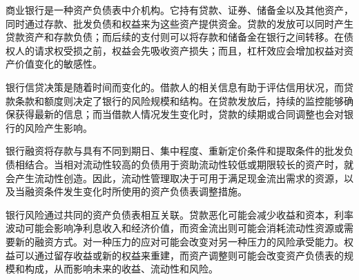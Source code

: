 

商业银行是一种资产负债表中介机构。它持有贷款、证券、储备金以及其他资产，同时通过存款、批发负债和权益来为这些资产提供资金。贷款的发放可以同时产生贷款资产和存款负债；而后续的支付则可以将存款和储备金在银行之间转移。在债权人的请求权受损之前，权益会先吸收资产损失；而且，杠杆效应会增加权益对资产价值变化的敏感性。

银行信贷决策是随着时间而变化的。借款人的相关信息有助于评估信用状况，而贷款条款和额度则决定了银行的风险规模和结构。在贷款发放后，持续的监控能够确保获得最新的信息；而当借款人情况发生变化时，贷款的续期或合同调整也会对银行的风险产生影响。

银行融资将存款与具有不同到期日、集中程度、重新定价条件和提取条件的批发负债相结合。当相对流动性较高的负债用于资助流动性较低或期限较长的资产时，就会产生流动性创造。因此，流动性管理取决于可用于满足现金流出需求的资源，以及当融资条件发生变化时所使用的资产负债表调整措施。

银行风险通过共同的资产负债表相互关联。贷款恶化可能会减少收益和资本，利率波动可能会影响净利息收入和经济价值，而资金流出则可能会消耗流动性资源或需要新的融资方式。对一种压力的应对可能会改变对另一种压力的风险承受能力。权益可以通过留存收益或新的权益来重建，而资产调整则可能会改变资产负债表的规模和构成，从而影响未来的收益、流动性和风险。



